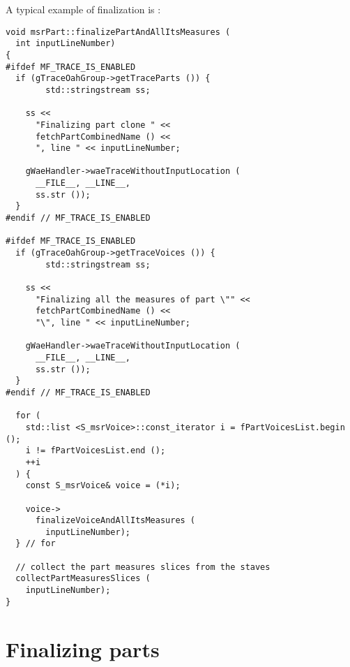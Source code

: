 A typical example of \cascading finalization is :
\begin{lstlisting}[language=CPlusPlus]
void msrPart::finalizePartAndAllItsMeasures (
  int inputLineNumber)
{
#ifdef MF_TRACE_IS_ENABLED
  if (gTraceOahGroup->getTraceParts ()) {
		std::stringstream ss;

    ss <<
      "Finalizing part clone " <<
      fetchPartCombinedName () <<
      ", line " << inputLineNumber;

    gWaeHandler->waeTraceWithoutInputLocation (
      __FILE__, __LINE__,
      ss.str ());
  }
#endif // MF_TRACE_IS_ENABLED

#ifdef MF_TRACE_IS_ENABLED
  if (gTraceOahGroup->getTraceVoices ()) {
		std::stringstream ss;

    ss <<
      "Finalizing all the measures of part \"" <<
      fetchPartCombinedName () <<
      "\", line " << inputLineNumber;

    gWaeHandler->waeTraceWithoutInputLocation (
      __FILE__, __LINE__,
      ss.str ());
  }
#endif // MF_TRACE_IS_ENABLED

  for (
    std::list <S_msrVoice>::const_iterator i = fPartVoicesList.begin ();
    i != fPartVoicesList.end ();
    ++i
  ) {
    const S_msrVoice& voice = (*i);

    voice->
      finalizeVoiceAndAllItsMeasures (
        inputLineNumber);
  } // for

  // collect the part measures slices from the staves
  collectPartMeasuresSlices (
    inputLineNumber);
}
\end{lstlisting}


\section{Finalizing parts}

